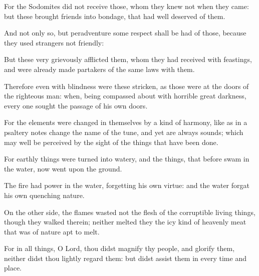 {\par }{\PP {}For the Sodomites did not receive those, whom they knew not when they came: but these brought friends into bondage, that had well deserved of them.
\par }{\PP {}And not only so, but peradventure some respect shall be had of those, because they used strangers not friendly:
\par }{\PP {}But these very grievously afflicted them, whom they had received with feastings, and were already made partakers of the same laws with them.
\par }{\PP {}Therefore even with blindness were these stricken, as those were at the doors of the righteous man: when, being compassed about with horrible great darkness, every one sought the passage of his own doors.
\par }{\PP {}For the elements were changed in themselves by a kind of harmony, like as in a psaltery notes change the name of the tune, and yet are always sounds; which may well be perceived by the sight of the things that have been done.
\par }{\PP {}For earthly things were turned into watery, and the things, that before swam in the water, now went upon the ground.
\par }{\PP {}The fire had power in the water, forgetting his own virtue: and the water forgat his own quenching nature.
\par }{\PP {}On the other side, the flames wasted not the flesh of the corruptible living things, though they walked therein; neither melted they the icy kind of heavenly meat that was of nature apt to melt.
\par }{\PP {}For in all things, O Lord, thou didst magnify thy people, and glorify them, neither didst thou lightly regard them: but didst assist them in every time and place.
\par }